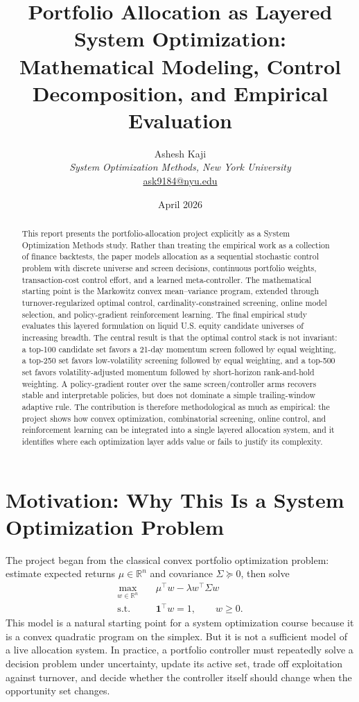 \documentclass[11pt,a4paper]{article}
\title{\textbf{Portfolio Allocation as Layered System Optimization:}\\ Mathematical Modeling, Control Decomposition, and Empirical Evaluation}
\author{Ashesh Kaji\\\textit{System Optimization Methods, New York University}\\\href{mailto:ask9184@nyu.edu}{ask9184@nyu.edu}}
\date{April 2026}
\newcommand{\R}{\mathbb{R}}
\newcommand{\one}{\mathbf{1}}
\begin{document}
\maketitle

\begin{abstract}
This report presents the portfolio-allocation project explicitly as a System Optimization Methods study. Rather than treating the empirical work as a collection of finance backtests, the paper models allocation as a sequential stochastic control problem with discrete universe and screen decisions, continuous portfolio weights, transaction-cost control effort, and a learned meta-controller. The mathematical starting point is the Markowitz convex mean--variance program, extended through turnover-regularized optimal control, cardinality-constrained screening, online model selection, and policy-gradient reinforcement learning. The final empirical study evaluates this layered formulation on liquid U.S. equity candidate universes of increasing breadth. The central result is that the optimal control stack is not invariant: a top-100 candidate set favors a 21-day momentum screen followed by equal weighting, a top-250 set favors low-volatility screening followed by equal weighting, and a top-500 set favors volatility-adjusted momentum followed by short-horizon rank-and-hold weighting. A policy-gradient router over the same screen/controller arms recovers stable and interpretable policies, but does not dominate a simple trailing-window adaptive rule. The contribution is therefore methodological as much as empirical: the project shows how convex optimization, combinatorial screening, online control, and reinforcement learning can be integrated into a single layered allocation system, and it identifies where each optimization layer adds value or fails to justify its complexity.
\end{abstract}

\section{Motivation: Why This Is a System Optimization Problem}
The project began from the classical convex portfolio optimization problem: estimate expected returns $\mu\in\R^n$ and covariance $\Sigma\succeq0$, then solve
\begin{equation}
\begin{aligned}
\max_{w\in\R^n}\quad & \mu^\top w - \lambda w^\top \Sigma w\\
\text{s.t.}\quad & \one^\top w = 1,\qquad w\ge 0.
\end{aligned}
\label{eq:markowitz}
\end{equation}
This model is a natural starting point for a system optimization course because it is a convex quadratic program on the simplex. But it is not a sufficient model of a live allocation system. In practice, a portfolio controller must repeatedly solve a decision problem under uncertainty, update its active set, trade off exploitation against turnover, and decide whether the controller itself should change when the opportunity set changes.
\end{document}
